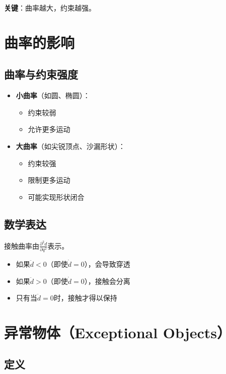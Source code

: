 \documentclass[12pt,a4paper]{article}
\begin{document}
\textbf{关键}：曲率越大，约束越强。

\section{曲率的影响}

\subsection{曲率与约束强度}

\begin{itemize}
\item \textbf{小曲率}（如圆、椭圆）：
  \begin{itemize}
  \item 约束较弱
  \item 允许更多运动
  \end{itemize}

\item \textbf{大曲率}（如尖锐顶点、沙漏形状）：
  \begin{itemize}
  \item 约束较强
  \item 限制更多运动
  \item 可能实现形状闭合
  \end{itemize}
\end{itemize}

\subsection{数学表达}

接触曲率由$\frac{\partial^2 d}{\partial q^2}$表示。

\begin{itemize}
\item 如果$\ddot{d} < 0$（即使$\dot{d} = 0$），会导致穿透
\item 如果$\ddot{d} > 0$（即使$\dot{d} = 0$），接触会分离
\item 只有当$\ddot{d} = 0$时，接触才得以保持
\end{itemize}

\section{异常物体（Exceptional Objects）}

\subsection{定义}
\end{document}
